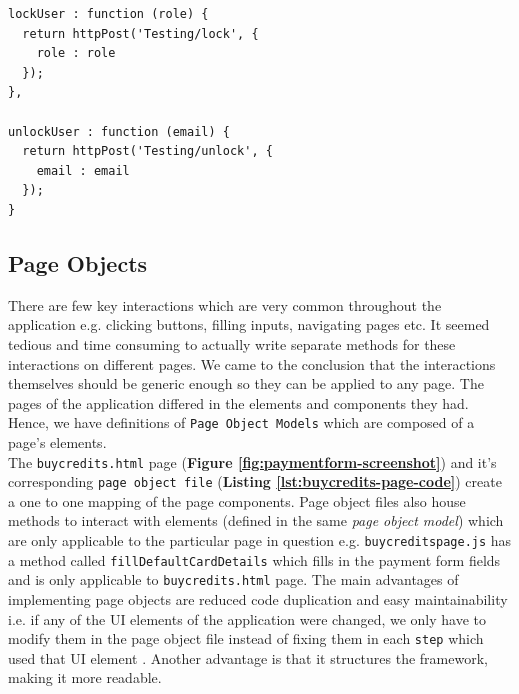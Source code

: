 \begin{listing}[H]
\begin{verbatim}
lockUser : function (role) {
  return httpPost('Testing/lock', {
    role : role
  });
},

unlockUser : function (email) {
  return httpPost('Testing/unlock', {
    email : email
  });
}
\end{verbatim}
\label{lst:lock-and-unlock-users}
\end{listing}

\subsection{Page Objects}
\label{subsec:page-objects}
There are few key interactions which are very common throughout the application e.g. clicking buttons, filling inputs, navigating pages etc. It seemed tedious and time consuming to actually write separate methods for these interactions on different pages. We came to the conclusion that the interactions themselves should be generic enough so they can be applied to any page. The pages of the application differed in the elements and components they had. Hence, we have definitions of \texttt{Page Object Models} which are composed of a page's elements.\\

The \texttt{buycredits.html} page (\textbf{Figure \ref{fig:paymentform-screenshot}}) and it's corresponding \texttt{page object file} (\textbf{Listing \ref{lst:buycredits-page-code}}) create  a one to one mapping of the page components. Page object files also house methods to interact with elements (defined in the same \textit{page object model}) which are only applicable to the particular page in question e.g. \texttt{buycreditspage.js} has a method called \texttt{fillDefaultCardDetails} which fills in the payment form fields and is only applicable to \texttt{buycredits.html} page. The main advantages of implementing page objects are reduced code duplication and easy maintainability i.e.  if any of the UI elements of the application were changed, we only have to modify them in the page object file instead of fixing them in each \texttt{step} which used that UI element \cite{semaphore}. Another advantage is that it structures the framework, making it more readable.

